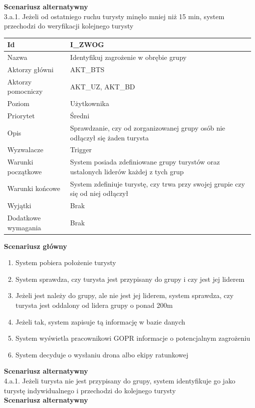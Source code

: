 \documentclass[a4paper,12pt]{article}
\begin{document}
\textbf{Scenariusz alternatywny}\\
3.a.1. Jeżeli od ostatniego ruchu turysty minęło mniej niż 15 min, system przechodzi do weryfikacji kolejnego turysty
\newpage
\begin{longtable}{| p{5cm} | p{10cm} |}
\hline
Id & I\_ZWOG \\\hline
Nazwa & Identyfikuj zagrożenie w obrębie grupy \\\hline
Aktorzy główni & AKT\_BTS \\\hline
Aktorzy pomocniczy & AKT\_UZ, AKT\_BD \\\hline
Poziom & Użytkownika \\\hline
Priorytet & Średni \\\hline
Opis & Sprawdzanie, czy od zorganizowanej grupy osób nie odłączył się żaden turysta \\\hline
Wyzwalacze & Trigger \\\hline
Warunki początkowe & System posiada zdefiniowane grupy turystów oraz ustalonych liderów każdej z tych grup \\\hline
Warunki końcowe & System zdefiniuje turystę, czy trwa przy swojej grupie czy się od niej odłączył \\\hline
Wyjątki & Brak \\\hline
Dodatkowe wymagania & Brak \\\hline
\end{longtable}
\textbf{Scenariusz główny}
\begin{enumerate}
\item System pobiera położenie turysty
\item System sprawdza, czy turysta jest przypisany do grupy i czy jest jej liderem
\item Jeżeli jest należy do grupy, ale nie jest jej liderem, system sprawdza, czy turysta jest oddalony od lidera grupy o ponad 200m
\item Jeżeli tak, system zapisuje tą informację w bazie danych
\item System wyświetla pracownikowi GOPR informacje o potencjalnym zagrożeniu
\item System decyduje o wysłaniu drona albo ekipy ratunkowej
\end{enumerate}
\textbf{Scenariusz alternatywny}\\
4.a.1.	Jeżeli turysta nie jest przypisany do grupy, system identyfikuje go jako turystę indywidualnego i przechodzi do kolejnego turysty\\
\textbf{Scenariusz alternatywny}\\
\end{document}
